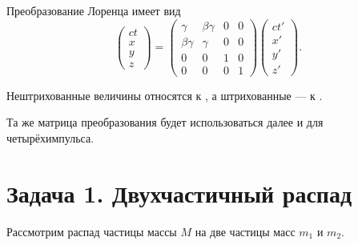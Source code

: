 \documentclass[../final.tex]{subfiles}
\begin{document}
Преобразование Лоренца имеет вид
%
\begin{equation*}
    \begin{pmatrix}
        ct\\
        x\\
        y\\
        z
    \end{pmatrix}
    =
    \begin{pmatrix}
        \gamma      & \beta\gamma & 0 & 0\\
        \beta\gamma & \gamma      & 0 & 0\\
        0           & 0           & 1 & 0\\
        0           & 0           & 0 & 1
    \end{pmatrix}
    \begin{pmatrix}
        ct'\\
        x'\\
        y'\\
        z'
    \end{pmatrix}.
\end{equation*}

Нештрихованные величины относятся к
,
а штрихованные --- к
.

Та же матрица преобразования будет использоваться далее и для
четырёхимпульса.



\newpage
\section{Задача 1. Двухчастичный распад}

Рассмотрим распад частицы массы $M$ на две частицы масс $m_1$ и $m_2$.
\end{document}
